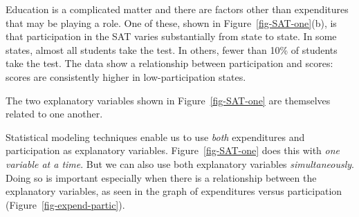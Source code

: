 \documentclass[
  letterpaper,
  DIV=11,
  numbers=noendperiod,
  oneside]{scrartcl}
\newenvironment{Shaded}{\begin{snugshade}}{\end{snugshade}}
\newcommand{\AttributeTok}[1]{\textcolor[rgb]{0.40,0.45,0.13}{#1}}
\newcommand{\FunctionTok}[1]{\textcolor[rgb]{0.28,0.35,0.67}{#1}}
\newcommand{\NormalTok}[1]{\textcolor[rgb]{0.00,0.23,0.31}{#1}}
\newcommand{\SpecialCharTok}[1]{\textcolor[rgb]{0.37,0.37,0.37}{#1}}
\newcommand{\StringTok}[1]{\textcolor[rgb]{0.13,0.47,0.30}{#1}}
\begin{document}
Education is a complicated matter and there are factors other than
expenditures that may be playing a role. One of these, shown in
Figure~\ref{fig-SAT-one}(b), is that participation in the SAT varies
substantially from state to state. In some states, almost all students
take the test. In others, fewer than 10\% of students take the test. The
data show a relationship between participation and scores: scores are
consistently higher in low-participation states.

\begin{Shaded}
\end{Shaded}

\begin{marginfigure}


\caption{\label{fig-expend-partic}The two explanatory variables shown in
Figure~\ref{fig-SAT-one} are themselves related to one another.}

\end{marginfigure}%

Statistical modeling techniques enable us to use \emph{both}
expenditures and participation as explanatory variables.
Figure~\ref{fig-SAT-one} does this with \emph{one variable at a time}.
But we can also use both explanatory variables \emph{simultaneously}.
Doing so is important especially when there is a relationship between
the explanatory variables, as seen in the graph of expenditures versus
participation (Figure~\ref{fig-expend-partic}).
\end{document}
